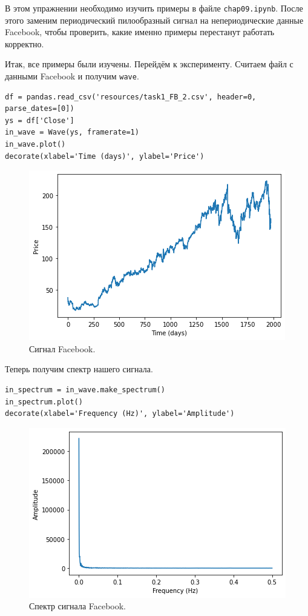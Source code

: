 \documentclass[a4paper, 14pt]{extarticle}
\begin{document}
    В этом упражнении необходимо изучить примеры в файле \texttt{chap09.ipynb}.
    После этого заменим периодический пилообразный сигнал на непериодические данные Facebook, чтобы проверить,
    какие именно примеры перестанут работать корректно.

    Итак, все примеры были изучены. Перейдём к эксперименту. Считаем файл с данными Facebook и получим \texttt{wave}.

    \begin{lstlisting}[caption= Чтение файла и получение \texttt{wave}., label={lst:task1_in_wave}]
df = pandas.read_csv('resources/task1_FB_2.csv', header=0, parse_dates=[0])
ys = df['Close']
in_wave = Wave(ys, framerate=1)
in_wave.plot()
decorate(xlabel='Time (days)', ylabel='Price')  \end{lstlisting}

    \begin{figure}[h]
        \centering
        \includegraphics[width=0.8\linewidth]{resources/Images/task1_in_wave}
        \caption{Сигнал Facebook.}
        \label{fig:task1_in_wave}
    \end{figure}

    Теперь получим спектр нашего сигнала.

    \begin{lstlisting}[caption= Получение спектра сигнала Facebook., label={lst:task1_in_spectrum}]
in_spectrum = in_wave.make_spectrum()
in_spectrum.plot()
decorate(xlabel='Frequency (Hz)', ylabel='Amplitude')   \end{lstlisting}

    \begin{figure}[H]
        \centering
        \includegraphics[width=0.7\linewidth]{resources/Images/task1_in_spectrum}
        \caption{Спектр сигнала Facebook.}
        \label{fig:task1_in_spectrum}
    \end{figure}
\end{document}
